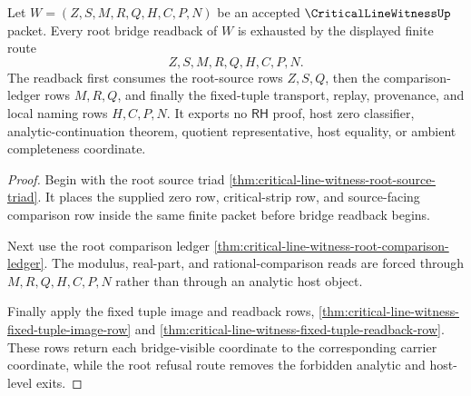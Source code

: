 \begin{theorem}
\label{thm:critical-line-witness-root-bridge-readback-totality}
Let $W=(Z,S,M,R,Q,H,C,P,N)$ be an accepted $\CriticalLineWitnessUp$ packet.
Every root bridge readback of $W$ is exhausted by the displayed finite route
$$
Z,S,M,R,Q,H,C,P,N.
$$
The readback first consumes the root-source rows $Z,S,Q$, then the
comparison-ledger rows $M,R,Q$, and finally the fixed-tuple transport, replay,
provenance, and local naming rows $H,C,P,N$. It exports no $\mathsf{RH}$ proof,
host zero classifier, analytic-continuation theorem, quotient representative,
host equality, or ambient completeness coordinate.
\end{theorem}
\begin{proof}
Begin with the root source triad
\autoref{thm:critical-line-witness-root-source-triad}. It places the supplied
zero row, critical-strip row, and source-facing comparison row inside the same
finite packet before bridge readback begins.

Next use the root comparison ledger
\autoref{thm:critical-line-witness-root-comparison-ledger}. The modulus,
real-part, and rational-comparison reads are forced through $M,R,Q,H,C,P,N$
rather than through an analytic host object.

Finally apply the fixed tuple image and readback rows,
\autoref{thm:critical-line-witness-fixed-tuple-image-row} and
\autoref{thm:critical-line-witness-fixed-tuple-readback-row}. These rows return
each bridge-visible coordinate to the corresponding carrier coordinate, while
the root refusal route removes the forbidden analytic and host-level exits.
\end{proof}

